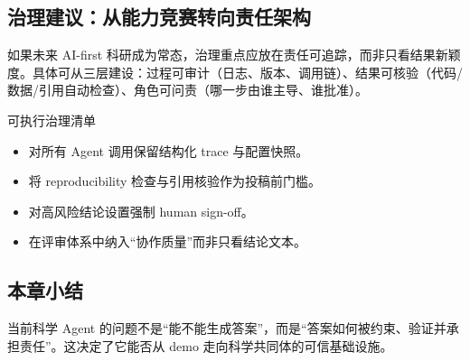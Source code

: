 \subsection{治理建议：从能力竞赛转向责任架构}

如果未来 AI-first 科研成为常态，治理重点应放在责任可追踪，而非只看结果新颖度。具体可从三层建设：过程可审计（日志、版本、调用链）、结果可核验（代码/数据/引用自动检查）、角色可问责（哪一步由谁主导、谁批准）。

\begin{importantbox}{可执行治理清单}
\begin{itemize}
    \item 对所有 Agent 调用保留结构化 trace 与配置快照。
    \item 将 reproducibility 检查与引用核验作为投稿前门槛。
    \item 对高风险结论设置强制 human sign-off。
    \item 在评审体系中纳入``协作质量''而非只看结论文本。
\end{itemize}
\end{importantbox}

\subsection{本章小结}

当前科学 Agent 的问题不是``能不能生成答案''，而是``答案如何被约束、验证并承担责任''。这决定了它能否从 demo 走向科学共同体的可信基础设施。

